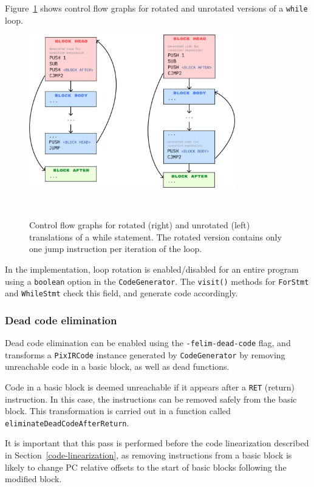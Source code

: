 \documentclass[11pt,a4paper]{scrartcl}
\begin{document}
Figure~\ref{fig:loop-rotation} shows control flow graphs for rotated and unrotated versions of a \verb|while| loop.

\begin{figure}
  \centering
  \includegraphics[width=0.8\textwidth]{loop_rotation}
  \caption{Control flow graphs for rotated (right) and unrotated (left) translations of a while statement. The rotated version contains only one jump instruction per iteration of the loop.}~\label{fig:loop-rotation}
\end{figure}

In the implementation, loop rotation is enabled/disabled for an entire program using a \verb|boolean| option in the \verb|CodeGenerator|. The \verb|visit()| methods for \verb|ForStmt| and \verb|WhileStmt| check this field, and generate code accordingly.

\subsubsection{Dead code elimination}

Dead code elimination can be enabled using the \verb|-felim-dead-code| flag, and transforms a \verb|PixIRCode| instance generated by \verb|CodeGenerator| by removing unreachable code in a basic block, as well as dead functions.

Code in a basic block is deemed unreachable if it appears after a \verb|RET| (return) instruction. In this case, the instructions can be removed safely from the basic block. This transformation is carried out in a function called \verb|eliminateDeadCodeAfterReturn|.

It is important that this pass is performed before the code linearization described in Section~\ref{code-linearization}, as removing instructions from a basic block is likely to change PC relative offsets to the start of basic blocks following the modified block.
\end{document}

